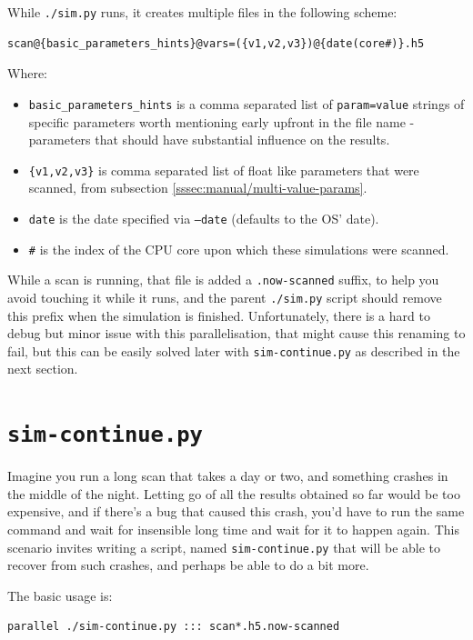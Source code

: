 While \texttt{./sim.py} runs, it creates multiple files in the following scheme:
	
\begin{verbatim}
scan@{basic_parameters_hints}@vars=({v1,v2,v3})@{date(core#)}.h5
\end{verbatim}

Where:

\begin{itemize}
	\item \texttt{basic\_parameters\_hints} is a comma separated list of \texttt{param=value} strings of specific parameters worth mentioning early upfront in the file name - parameters that should have substantial influence on the results. 
	\item \texttt{\{v1,v2,v3\}} is comma separated list of float like parameters that were scanned, from subsection \ref{sssec:manual/multi-value-params}.
	\item \texttt{date} is the date specified via \texttt{--date} (defaults to the OS' date).
	\item \texttt{\#} is the index of the CPU core upon which these simulations were scanned.
\end{itemize}

While a scan is running, that file is added a \texttt{.now-scanned} suffix, to help you avoid touching it while it runs, and the parent \texttt{./sim.py} script should remove this prefix when the simulation is finished. Unfortunately, there is a hard to debug but minor issue with this parallelisation, that might cause this renaming to fail, but this can be easily solved later with \texttt{sim-continue.py} as described in the next section.

\section{\texttt{sim-continue.py}}\label{ssec:sim-continue}

Imagine you run a long scan that takes a day or two, and something crashes in the middle of the night. Letting go of all the results obtained so far would be too expensive, and if there's a bug that caused this crash, you'd have to run the same command and wait for insensible long time and wait for it to happen again. This scenario invites writing a script, named \texttt{sim-continue.py} that will be able to recover from such crashes, and perhaps be able to do a bit more.

The basic usage is:

\begin{verbatim}
parallel ./sim-continue.py ::: scan*.h5.now-scanned
\end{verbatim}

